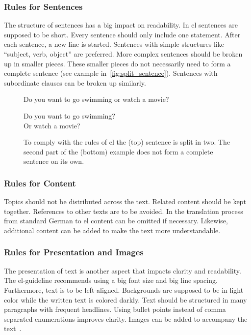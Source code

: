 \subsubsection{Rules for Sentences}
The structure of sentences has a big impact on readability. %
In \gls{el} sentences are supposed to be short.
Every sentence should only include one statement.
After each sentence, a new line is started.
Sentences with simple structures like \enquote{subject, verb, object} are preferred.
More complex sentences should be broken up in smaller pieces.
These smaller pieces do not necessarily need to form a complete sentence (see example in~\autoref{fig:split_sentence}).
Sentences with subordinate clauses can be broken up similarly.
\begin{figure}
    \begin{center}
        \colorbox{axablue!20}{
            \begin{minipage}{0.6\textwidth}
                Do you want to go swimming or watch a movie?
            \end{minipage}
        }
        \colorbox{goodgreen!20}{
            \begin{minipage}{0.6\textwidth}
                Do you want to go swimming? \\
                Or watch a movie?
            \end{minipage}
        }
    \end{center}
    \caption[Splitting longer sentences into smaller parts in .]{To comply with the rules of \gls{el} the (top) sentence is split in two. The second part of the (bottom) example does not form a complete sentence on its own.}
    \label{fig:split_sentence}
\end{figure}

\subsubsection{Rules for Content}
Topics should not be distributed across the text.
Related content should be kept together.
References to other texts are to be avoided.
In the translation process from standard German to \gls{el} content can be omitted if necessary.
Likewise, additional content can be added to make the text more understandable.

\subsubsection{Rules for Presentation and Images}
The presentation of text is another aspect that impacts clarity and readability.
The \gls{el}-guideline recommends using a big font size and big line spacing.
Furthermore, text is to be left-aligned.
Backgrounds are supposed to be in light color while the written text is colored darkly.
Text should be structured in many paragraphs with frequent headlines.
Using bullet points instead of comma separated enumerations improves clarity.
Images can be added to accompany the text~\autocite{netzwerkLS}.

